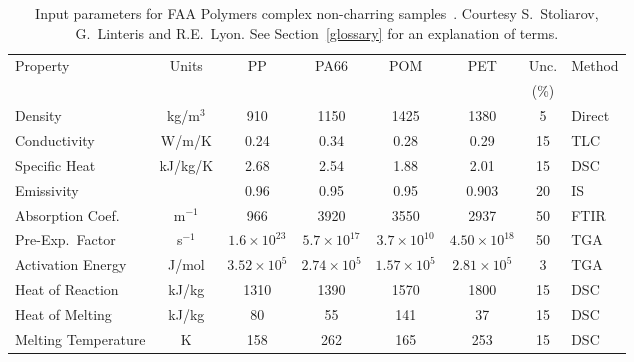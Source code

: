 \begin{table}[h!]
\caption[FAA complex non-charring polymer properties]{Input parameters for FAA Polymers complex non-charring samples~\cite{Stoliarov:FM2012}. Courtesy S.~Stoliarov, G.~Linteris and R.E.~Lyon. See Section~\ref{glossary} for an explanation of terms.}
\begin{center}
\begin{tabular}{|l|c|c|c|c|c|c|l|}
\hline
Property                    & Units         & PP                    & PA66                  & POM                   & PET                   & Unc.      & Method    \\
                            &               &                       &                       &                       &                       & (\%)      &           \\ \hline \hline
Density                     & kg/m$^3$      & 910                   & 1150                  & 1425                  & 1380                  & 5         & Direct    \\ \hline
Conductivity                & W/m/K         & 0.24                  & 0.34                  & 0.28                  & 0.29                  & 15        & TLC       \\ \hline
Specific Heat               & kJ/kg/K       & 2.68                  & 2.54                  & 1.88                  & 2.01                  & 15        & DSC       \\ \hline
Emissivity                  &               & 0.96                  & 0.95                  & 0.95                  & 0.903                 & 20        & IS        \\ \hline
Absorption Coef.            & m$^{-1}$      & 966                   & 3920                  & 3550                  & 2937                  & 50        & FTIR      \\ \hline
Pre-Exp.~Factor             & s$^{-1}$      & $1.6 \times 10^{23}$  & $5.7 \times 10^{17}$  & $3.7 \times 10^{10}$  & $4.50 \times 10^{18}$ & 50        & TGA       \\ \hline
Activation Energy           & J/mol       & $3.52 \times 10^{5}$  & $2.74 \times 10^{5}$  & $1.57 \times 10^{5}$  & $2.81 \times 10^{5}$  & 3         & TGA       \\ \hline
Heat of Reaction            & kJ/kg         & 1310                  & 1390                  & 1570                  & 1800                  & 15        & DSC       \\ \hline
Heat of Melting             & kJ/kg         & 80                    & 55                    & 141                   & 37                    & 15        & DSC       \\ \hline
Melting Temperature         & K             & 158                   & 262                   & 165                   & 253                   & 15        & DSC       \\ \hline

\end{tabular}
\end{center}
\label{FAA_Properties2}
\end{table}



